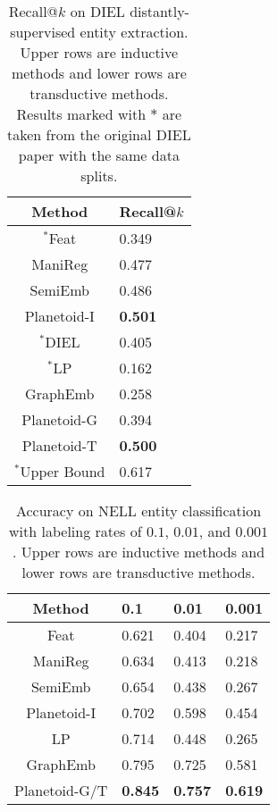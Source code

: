 \begin{table}[tb]
\caption{Recall@$k$ on DIEL distantly-supervised entity extraction. Upper rows are inductive methods and lower rows are transductive methods. Results marked with $*$ are taken from the original DIEL paper \cite{bingimproving} with the same data splits.}
\label{tab:distant}
\vskip 0.15in
\begin{center}
\begin{small}
\begin{sc}
\begin{tabular}{cl}
Method & Recall@$k$ \\
\hline
\abovespace
$^*$Feat & 0.349 \\
ManiReg & 0.477 \\
SemiEmb & 0.486 \\
Planetoid-I & \textbf{0.501} \\
\hline
\abovespace
$^*$DIEL & 0.405 \\
$^*$LP & 0.162 \\
GraphEmb & 0.258 \\
Planetoid-G & 0.394 \\
Planetoid-T & \textbf{0.500} \\
\hline
\abovespace
$^*$Upper Bound & 0.617 \\
\end{tabular}
\end{sc}
\end{small}
\end{center}
\vskip -0.1in
\end{table}

\begin{table}[tb]
\caption{Accuracy on NELL entity classification with labeling rates of 
$0.1$, $0.01$, and $0.001$. Upper rows are inductive methods and lower rows are transductive methods.}
\label{tab:entity}
\vskip 0.15in
\begin{center}
\begin{small}
\begin{sc}
\begin{tabular}{clll}
Method & 0.1 & 0.01 & 0.001 \\
\hline
\abovespace
Feat & 0.621 & 0.404 & 0.217 \\
ManiReg & 0.634 & 0.413 & 0.218 \\
SemiEmb & 0.654 & 0.438 & 0.267 \\
Planetoid-I & 0.702 & 0.598 & 0.454 \\
\hline
\abovespace
LP & 0.714 & 0.448 & 0.265 \\
GraphEmb & 0.795 & 0.725 & 0.581 \\
Planetoid-G/T & \textbf{0.845} & \textbf{0.757} & \textbf{0.619} \\
\end{tabular}
\end{sc}
\end{small}
\end{center}
\vskip -0.1in
\end{table}


